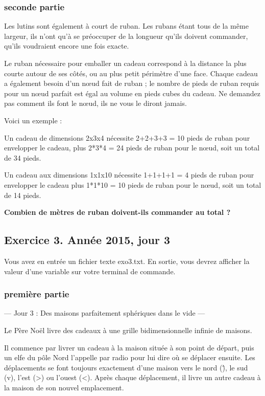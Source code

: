 \subsubsection{seconde partie}


Les lutins sont également à court de ruban. Les rubans étant tous de la même largeur, ils n'ont qu'à se préoccuper de la longueur qu'ils doivent commander, qu'ils voudraient encore une fois exacte.

Le ruban nécessaire pour emballer un cadeau correspond à la distance la plus courte autour de ses côtés, ou au plus petit périmètre d'une face. Chaque cadeau a également besoin d'un nœud fait de ruban ; le nombre de pieds de ruban requis pour un nœud parfait est égal au volume en pieds cubes du cadeau. Ne demandez pas comment ils font le nœud, ils ne vous le diront jamais.

Voici un exemple :

    Un cadeau de dimensions 2x3x4 nécessite 2+2+3+3 = 10 pieds de ruban pour envelopper le cadeau, plus 2*3*4 = 24 pieds de ruban pour le nœud, soit un total de 34 pieds.
    
    Un cadeau aux dimensions 1x1x10 nécessite 1+1+1+1 = 4 pieds de ruban pour envelopper le cadeau plus 1*1*10 = 10 pieds de ruban pour le nœud, soit un total de 14 pieds.

\textbf{Combien de mètres de ruban doivent-ils commander au total ?}


\subsection{Exercice 3. Année 2015, jour 3}


Vous avez en entrée un fichier texte exo3.txt.
En sortie, vous devrez afficher la valeur d'une variable sur votre terminal de commande.

\subsubsection{première partie}

--- Jour 3 : Des maisons parfaitement sphériques dans le vide ---

Le Père Noël livre des cadeaux à une grille bidimensionnelle infinie de maisons.

Il commence par livrer un cadeau à la maison située à son point de départ, puis un elfe du pôle Nord l'appelle par radio pour lui dire où se déplacer ensuite. Les déplacements se font toujours exactement d'une maison vers le nord (\^), le sud (v), l'est (>) ou l'ouest (<). Après chaque déplacement, il livre un autre cadeau à la maison de son nouvel emplacement.

